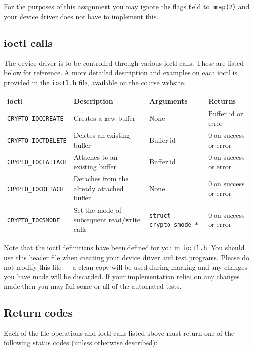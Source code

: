 \documentclass[12pt,a4paper]{article}
\begin{document}
For the purposes of this assignment you may ignore the flags field to
\texttt{mmap(2)} and your device driver does not have to implement this.

\subsection*{ioctl calls}

The device driver is to be controlled through various ioctl calls. These are listed
below for reference. A more detailed description and examples on each ioctl is provided
in the \texttt{ioctl.h} file, available on the course website.

\begin{longtable}{l p{4cm} l p{4cm}}
    \toprule
    \textbf{ioctl} & \textbf{Description} & \textbf{Arguments} & \textbf{Returns} \\
    \midrule

    \texttt{CRYPTO\_IOCCREATE} & Creates a new buffer & None & Buffer id or error \\
    \texttt{CRYPTO\_IOCTDELETE} & Deletes an existing buffer & Buffer id & 0 on success or error \\
    \texttt{CRYPTO\_IOCTATTACH} & Attaches to an existing buffer & Buffer id & 0 on success or error \\
    \texttt{CRYPTO\_IOCDETACH} & Detaches from the already attached buffer & None & 0 on success or error \\
    \texttt{CRYPTO\_IOCSMODE} & Set the mode of subsequent read\slash write calls & \texttt{struct crypto\_smode *} & 0 on success or error \\

    \bottomrule
\end{longtable}

Note that the ioctl definitions have been defined for you in \texttt{ioctl.h}.
You should use this header file when creating your device driver and test
programs.  Please do not modify this file --- a clean copy will be used during
marking and any changes you have made will be discarded. If your implementation
relies on any changes made then you may fail some or all of the automated tests.

\subsection*{Return codes}

Each of the file operations and ioctl calls listed above must return one of the
following status codes (unless otherwise described):
\end{document}

